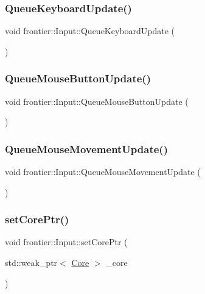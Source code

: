 \subsubsection{\texorpdfstring{Queue\+Keyboard\+Update()}{QueueKeyboardUpdate()}}
{\footnotesize\ttfamily void frontier\+::\+Input\+::\+Queue\+Keyboard\+Update (\begin{DoxyParamCaption}{ }\end{DoxyParamCaption})}

\mbox{\label{classfrontier_1_1_input_a3a78acf75eb63bfcd504b0eca34ce7c2}} 
\subsubsection{\texorpdfstring{Queue\+Mouse\+Button\+Update()}{QueueMouseButtonUpdate()}}
{\footnotesize\ttfamily void frontier\+::\+Input\+::\+Queue\+Mouse\+Button\+Update (\begin{DoxyParamCaption}{ }\end{DoxyParamCaption})}

\mbox{\label{classfrontier_1_1_input_adad2b084e3ddc0ddcf6db9d6f5ebf307}} 
\subsubsection{\texorpdfstring{Queue\+Mouse\+Movement\+Update()}{QueueMouseMovementUpdate()}}
{\footnotesize\ttfamily void frontier\+::\+Input\+::\+Queue\+Mouse\+Movement\+Update (\begin{DoxyParamCaption}{ }\end{DoxyParamCaption})}

\mbox{\label{classfrontier_1_1_input_ab3326fdae63e71c2d6c7e5bc8dad167c}} 
\subsubsection{\texorpdfstring{set\+Core\+Ptr()}{setCorePtr()}}
{\footnotesize\ttfamily void frontier\+::\+Input\+::set\+Core\+Ptr (\begin{DoxyParamCaption}\item[{std\+::weak\+\_\+ptr$<$ \hyperlink{classfrontier_1_1_core}{Core} $>$}]{\+\_\+core }\end{DoxyParamCaption})}

